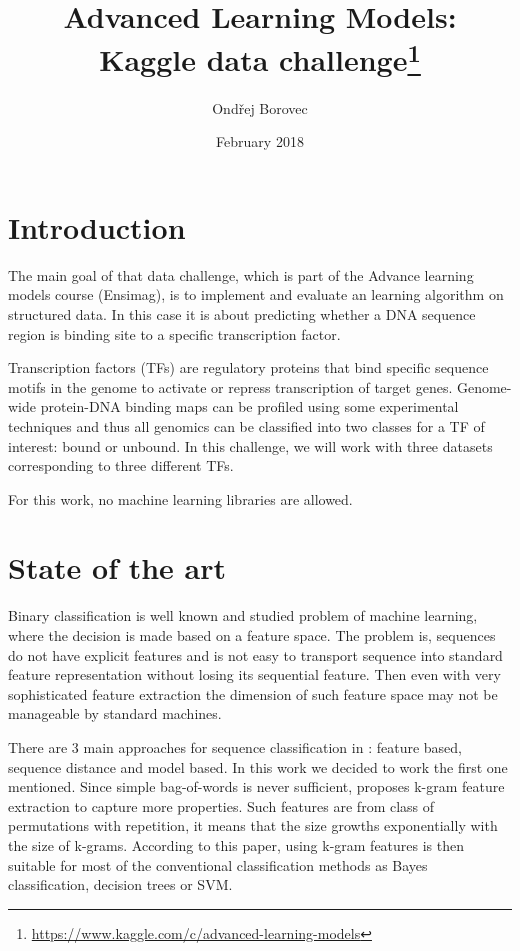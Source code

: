 \documentclass{article}
\title{Advanced Learning Models:\\ Kaggle data challenge\footnote{\url{https://www.kaggle.com/c/advanced-learning-models}}}
\author{Ondřej Borovec}
\date{February 2018}
\begin{document}
\maketitle

\section{Introduction}

The main goal of that data challenge, which is part of the Advance learning models course (Ensimag), is to implement and evaluate an learning algorithm on structured data. In this case it is about predicting whether a DNA sequence region is binding site to a specific transcription factor.  

Transcription factors (TFs) are regulatory proteins that bind specific sequence motifs in the genome to activate or repress transcription of target genes. Genome-wide protein-DNA binding maps can be profiled using some experimental techniques and thus all genomics can be classified into two classes for a TF of interest: bound or unbound. In this challenge, we will work with three datasets corresponding to three different TFs.

For this work, no machine learning libraries are allowed.

\section{State of the art}

Binary classification is well known and studied problem of machine learning, where the decision is made based on a feature space. The problem is, sequences do not have explicit features and is not easy to transport sequence into standard feature representation without losing its sequential feature. Then even with very sophisticated feature extraction the dimension of such feature space may not be manageable by standard machines.

There are 3 main approaches for sequence classification in \cite{xing2010brief}: feature based, sequence distance and model based. In this work we decided to work the first one mentioned. Since simple bag-of-words is never sufficient, \cite{xing2010brief} proposes k-gram feature extraction to capture more properties. Such features are from class of permutations with repetition, it means that the size growths exponentially with the size of k-grams. According to this paper, using k-gram features is then suitable for most of the conventional classification methods as Bayes classification, decision trees or SVM. 
\end{document}
